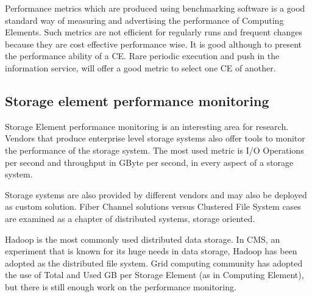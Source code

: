 Performance metrics which are produced using benchmarking software is a good standard way of measuring and advertising the performance of Computing Elements. Such metrics are not efficient for regularly runs and frequent changes because they are cost effective performance wise. It is good although to present the performance ability of a CE. Rare periodic execution and push in the information service, will offer a good metric to select one CE of another.

\subsection{Storage element performance monitoring}

Storage Element performance monitoring is an interesting area for research. Vendors that produce enterprise level storage systems also offer tools to monitor the performance of the storage system. The most used metric is I/O Operations per second and throughput in GByte per second, in every aspect of a storage system.

Storage systems are also provided by different vendors and may also be deployed as custom solution. Fiber Channel solutions versus Clustered File System cases are examined \cite{brzezniak2008analysis} as a chapter of distributed systems, storage oriented.

Hadoop is the most commonly used distributed data storage. In CMS, an experiment that is known for its huge needs in data storage, Hadoop has been adopted \cite{hadoop} as the distributed file system. Grid computing community has adopted the use of Total and Used GB per Storage Element (as in Computing Element), but there is still enough work on the performance monitoring.

